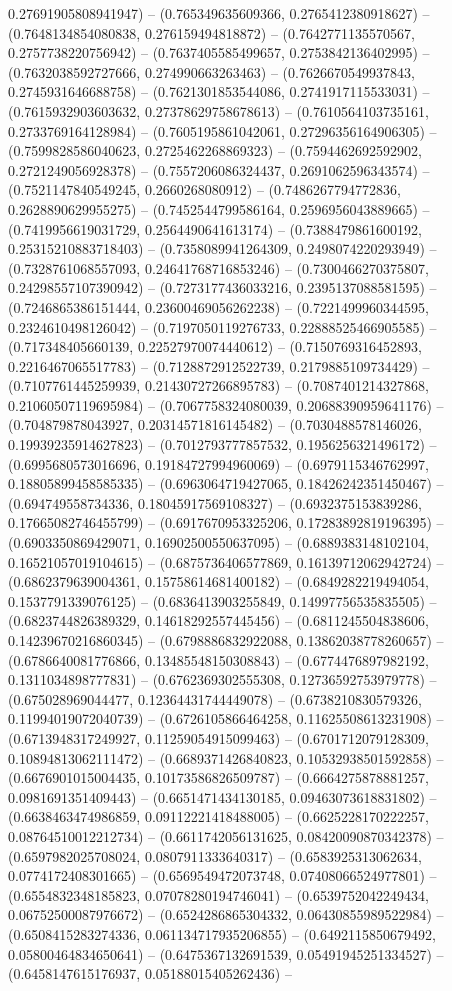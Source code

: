 0.27691905808941947) -- (0.765349635609366, 0.2765412380918627) -- (0.7648134854080838, 0.276159494818872) -- (0.7642771135570567, 0.2757738220756942) -- (0.7637405585499657, 0.2753842136402995) -- (0.7632038592727666, 0.274990663263463) -- (0.7626670549937843, 0.2745931646688758) -- (0.7621301853544086, 0.2741917115533031) -- (0.7615932903603632, 0.27378629758678613) -- (0.7610564103735161, 0.2733769164128984) -- (0.7605195861042061, 0.27296356164906305) -- (0.7599828586040623, 0.2725462268869323) -- (0.7594462692592902, 0.2721249056928378) -- (0.7557206086324437, 0.2691062596343574) -- (0.7521147840549245, 0.2660268080912) -- (0.7486267794772836, 0.2628890629955275) -- (0.7452544799586164, 0.2596956043889665) -- (0.7419956619031729, 0.2564490641613174) -- (0.7388479861600192, 0.25315210883718403) -- (0.7358089941264309, 0.2498074220293949) -- (0.7328761068557093, 0.24641768716853246) -- (0.7300466270375807, 0.24298557107390942) -- (0.7273177436033216, 0.2395137088581595) -- (0.7246865386151444, 0.23600469056262238) -- (0.7221499960344595, 0.2324610498126042) -- (0.7197050119276733, 0.22888525466905585) -- (0.717348405660139, 0.22527970074440612) -- (0.7150769316452893, 0.2216467065517783) -- (0.7128872912522739, 0.2179885109734429) -- (0.7107761445259939, 0.21430727266895783) -- (0.7087401214327868, 0.21060507119695984) -- (0.7067758324080039, 0.20688390959641176) -- (0.704879878043927, 0.20314571816145482) -- (0.7030488578146026, 0.19939235914627823) -- (0.7012793777857532, 0.1956256321496172) -- (0.6995680573016696, 0.19184727994960069) -- (0.6979115346762997, 0.18805899458585335) -- (0.6963064719427065, 0.18426242351450467) -- (0.694749558734336, 0.18045917569108327) -- (0.6932375153839286, 0.17665082746455799) -- (0.6917670953325206, 0.17283892819196395) -- (0.6903350869429071, 0.16902500550637095) -- (0.6889383148102104, 0.16521057019104615) -- (0.6875736406577869, 0.16139712062942724) -- (0.6862379639004361, 0.15758614681400182) -- (0.6849282219494054, 0.1537791339076125) -- (0.6836413903255849, 0.14997756535835505) -- (0.6823744826389329, 0.14618292557445456) -- (0.6811245504838606, 0.14239670216860345) -- (0.6798886832922088, 0.13862038778260657) -- (0.6786640081776866, 0.13485548150308843) -- (0.6774476897982192, 0.1311034898777831) -- (0.6762369302555308, 0.12736592753979778) -- (0.675028969044477, 0.12364431744449078) -- (0.6738210830579326, 0.11994019072040739) -- (0.6726105866464258, 0.11625508613231908) -- (0.6713948317249927, 0.11259054915099463) -- (0.6701712079128309, 0.10894813062111472) -- (0.6689371426840823, 0.10532938501592858) -- (0.6676901015004435, 0.10173586826509787) -- (0.6664275878881257, 0.0981691351409443) -- (0.6651471434130185, 0.09463073618831802) -- (0.6638463474986859, 0.09112221418488005) -- (0.6625228170222257, 0.08764510012212734) -- (0.6611742056131625, 0.08420090870342378) -- (0.6597982025708024, 0.0807911333640317) -- (0.6583925313062634, 0.0774172408301665) -- (0.6569549472073748, 0.07408066524977801) -- (0.6554832348185823, 0.07078280194746041) -- (0.6539752042249434, 0.06752500087976672) -- (0.6524286865304332, 0.06430855989522984) -- (0.6508415283274336, 0.061134717935206855) -- (0.6492115850679492, 0.05800464834650641) -- (0.6475367132691539, 0.05491945251334527) -- (0.6458147615176937, 0.05188015405262436) -- 